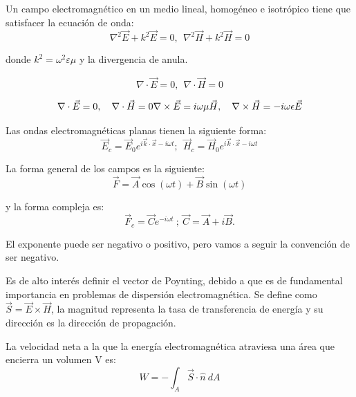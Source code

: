 \documentclass{article}
\begin{document}
Un campo electromagnético en un medio lineal, homogéneo e isotrópico tiene que satisfacer la ecuación de onda:
\begin{equation}
    \nabla^2\vec E + k^2 \vec E = 0, \ \  \nabla^2\vec H + k^2 \vec H = 0
\end{equation}

donde $k^2 = \omega^2\varepsilon\mu $ y la divergencia de anula.

\begin{equation}
    \nabla \cdot \vec E = 0, \ \ \nabla \cdot \vec H = 0
\end{equation}

\begin{equation}
 \nabla \cdot \vec{E}=0, \quad \nabla \cdot \vec{H}=0 \\
 \nabla \times \vec{E}=i \omega \mu \vec{H}, \quad \nabla \times \vec{H}=-i \omega \epsilon \vec{E}
\end{equation}

Las ondas electromagnéticas planas tienen la siguiente forma:
\begin{equation}
    \vec E_c = \vec E_0 e^{i\vec k \cdot \vec x-i\omega t}; \ \ \vec H_c = \vec H_0 e^{i\vec k \cdot \vec x-i\omega t}
\end{equation}


La forma general de los campos es la siguiente:
\begin{equation}
    \vec F = \vec A \cos(\omega t) + \vec B \sin(\omega t)
\end{equation}

y la forma compleja es:
\begin{equation}
    \vec F_c = \vec C e^{-i\omega t} \ ; \ \vec C = \vec A + i\vec B.
\end{equation}

El exponente puede ser negativo o positivo, pero vamos a seguir la convención de ser negativo.

Es de alto interés definir el vector de Poynting, debido a que es de fundamental importancia en problemas de dispersión electromagnética. Se define como $\vec S = \vec E \times \vec H$, la magnitud representa la tasa de transferencia de energía y su dirección es la dirección de propagación.



La velocidad neta a la que la energía electromagnética atraviesa una área que encierra un volumen V es:
\begin{equation}
    W = -\int_A \vec S \cdot \hat n  \ dA
\end{equation}
\end{document}
